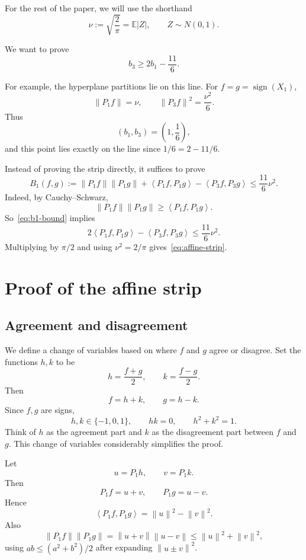 \documentclass[11pt]{article}
\numberwithin{equation}{section}
\newcommand{\E}{\mathbb E}
\newcommand{\ip}[2]{\left\langle #1,#2\right\rangle}
\newcommand{\norm}[1]{\left\|#1\right\|}
\newcommand{\sgn}{\operatorname{sign}}
\begin{document}
For the rest of the paper, we will use the shorthand
\[
        \nu:=\sqrt{\frac{2}{\pi}}=\E|Z|,
        \qquad Z\sim N(0,1).
\]

We want to prove
\begin{equation}
        b_3\ge 2b_1-\frac{11}{6}.
        \label{eq:affine-strip}
\end{equation}

For example, the hyperplane partitions lie on this line. For $f=g=\sgn(X_1)$,
\[
        \norm{P_1f}=\nu,
        \qquad
        \norm{P_3f}^2=\frac{\nu^2}{6}.
\]
Thus
\[
        (b_1,b_3)=\left(1,\frac16\right),
\]
and this point lies exactly on the line since $1/6=2-11/6$.

Instead of proving the strip directly, it suffices to prove
\begin{equation}
        B_1(f,g)
        :=\norm{P_1f}\norm{P_1g}
          +\ip{P_1f}{P_1g}
          -\ip{P_3f}{P_3g}
        \le \frac{11}{6}\nu^2.
        \label{eq:b1-bound}
\end{equation}
Indeed, by Cauchy--Schwarz,
\[
        \norm{P_1f}\norm{P_1g}\ge \ip{P_1f}{P_1g}.
\]
So~\eqref{eq:b1-bound} implies
\[
        2\ip{P_1f}{P_1g}-\ip{P_3f}{P_3g}\le \frac{11}{6}\nu^2.
\]
Multiplying by $\pi/2$ and using $\nu^2=2/\pi$ gives~\eqref{eq:affine-strip}.

\section{Proof of the affine strip}
\label{sec:affine-strip}

\subsection{Agreement and disagreement}
\label{sec:agreement-disagreement}

We define a change of variables based on where $f$ and $g$ agree or disagree. Set the functions $h,k$ to be
\[
        h=\frac{f+g}{2},\qquad k=\frac{f-g}{2}.
\]
Then
\[
        f=h+k,
        \qquad
        g=h-k.
\]
Since $f,g$ are signs,
\[
        h,k\in\{-1,0,1\},
        \qquad
        hk=0,
        \qquad
        h^2+k^2=1.
\]
Think of $h$ as the agreement part and $k$ as the disagreement part between $f$ and $g$. This change of variables considerably simplifies the proof.

Let
\[
        u=P_1h,
        \qquad
        v=P_1k.
\]
Then
\[
        P_1f=u+v,
        \qquad
        P_1g=u-v.
\]
Hence
\[
        \ip{P_1f}{P_1g}=\norm{u}^2-\norm{v}^2.
\]
Also
\[
        \norm{P_1f}\norm{P_1g}
        =\norm{u+v}\norm{u-v}
        \le \norm{u}^2+\norm{v}^2,
\]
using $ab\le(a^2+b^2)/2$ after expanding $\norm{u\pm v}^2$.
\end{document}
